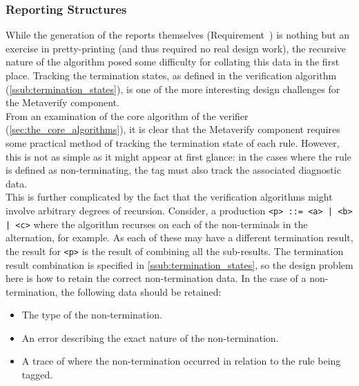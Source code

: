 
\subsubsection{Reporting Structures} %
\label{ssub:reporting_structures}

While the generation of the reports themselves (Requirement~) is nothing but an exercise in pretty-printing (and thus required no real design work), the recursive nature of the algorithm posed some difficulty for collating this data in the first place. 
Tracking the termination states, as defined in the verification algorithm (\autoref{ssub:termination_states}), is one of the more interesting design challenges for the Metaverify component.\\

From an examination of the core algorithm of the verifier (\autoref{sec:the_core_algorithms}), it is clear that the Metaverify component requires some practical method of tracking the termination state of each rule. 
However, this is not as simple as it might appear at first glance: in the cases where the rule is defined as non-terminating, the tag must also track the associated diagnostic data. \\

This is further complicated by the fact that the verification algorithms might involve arbitrary degrees of recursion. 
Consider, a production \texttt{<p> ::= <a> | <b> | <c>} where the algorithm recurses on each of the non-terminals in the alternation, for example. 
As each of these may have a different termination result, the result for \texttt{<p>} is the result of combining all the sub-results. 
The termination result combination is specified in \autoref{ssub:termination_states}, so the design problem here is how to retain the correct non-termination data. 
In the case of a non-termination, the following data should be retained:
\begin{itemize}
    \item The type of the non-termination.
    \item An error describing the exact nature of the non-termination.
    \item A trace of where the non-termination occurred in relation to the rule being tagged. 
\end{itemize}

